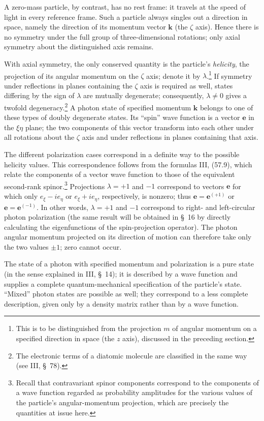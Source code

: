 A zero-mass particle, by contrast, has no rest frame: it travels at the speed of light in every reference frame. Such a particle always singles out a direction in space, namely the direction of its momentum vector $\mathbf{k}$ (the $\zeta$ axis). Hence there is no symmetry under the full group of three-dimensional rotations; only axial symmetry about the distinguished axis remains.

With axial symmetry, the only conserved quantity is the particle's \emph{helicity}, the projection of its angular momentum on the $\zeta$ axis; denote it by $\lambda$.\footnote{This is to be distinguished from the projection $m$ of angular momentum on a specified direction in space (the $z$ axis), discussed in the preceding section.} If symmetry under reflections in planes containing the $\zeta$ axis is required as well, states differing by the sign of $\lambda$ are mutually degenerate; consequently, $\lambda\ne0$ gives a twofold degeneracy.\footnote{The electronic terms of a diatomic molecule are classified in the same way (see III, \S~78).} A photon state of specified momentum $\mathbf{k}$ belongs to one of these types of doubly degenerate states. Its ``spin'' wave function is a vector $\mathbf{e}$ in the $\xi\eta$ plane; the two components of this vector transform into each other under all rotations about the $\zeta$ axis and under reflections in planes containing that axis.

The different polarization cases correspond in a definite way to the possible helicity values. This correspondence follows from the formulas III, (57.9), which relate the components of a vector wave function to those of the equivalent second-rank spinor.\footnote{Recall that contravariant spinor components correspond to the components of a wave function regarded as probability amplitudes for the various values of the particle's angular-momentum projection, which are precisely the quantities at issue here.} Projections $\lambda=+1$ and $-1$ correspond to vectors $\mathbf{e}$ for which only $e_\xi-ie_\eta$ or $e_\xi+ie_\eta$, respectively, is nonzero; thus $\mathbf{e}=\mathbf{e}^{(+1)}$ or $\mathbf{e}=\mathbf{e}^{(-1)}$. In other words, $\lambda=+1$ and $-1$ correspond to right- and left-circular photon polarization (the same result will be obtained in \S~16 by directly calculating the eigenfunctions of the spin-projection operator). The photon angular momentum projected on its direction of motion can therefore take only the two values $\pm1$; zero cannot occur.

The state of a photon with specified momentum and polarization is a pure state (in the sense explained in III, \S~14); it is described by a wave function and supplies a complete quantum-mechanical specification of the particle's state. ``Mixed'' photon states are possible as well; they correspond to a less complete description, given only by a density matrix rather than by a wave function.

